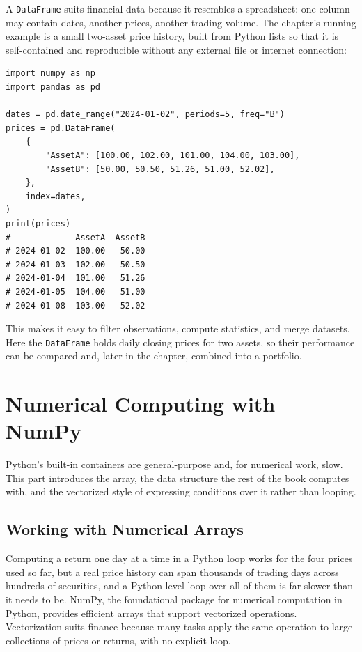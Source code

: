 \documentclass[../ai_in_finance]{subfiles}
\begin{document}
A \texttt{DataFrame} suits financial data because it resembles a spreadsheet: one column may contain dates, another prices, another trading volume. The chapter's running example is a small two-asset price history, built from Python lists so that it is self-contained and reproducible without any external file or internet connection:

\begin{verbatim}
import numpy as np
import pandas as pd

dates = pd.date_range("2024-01-02", periods=5, freq="B")
prices = pd.DataFrame(
    {
        "AssetA": [100.00, 102.00, 101.00, 104.00, 103.00],
        "AssetB": [50.00, 50.50, 51.26, 51.00, 52.02],
    },
    index=dates,
)
print(prices)
#             AssetA  AssetB
# 2024-01-02  100.00   50.00
# 2024-01-03  102.00   50.50
# 2024-01-04  101.00   51.26
# 2024-01-05  104.00   51.00
# 2024-01-08  103.00   52.02
\end{verbatim}

This makes it easy to filter observations, compute statistics, and merge datasets. Here the \texttt{DataFrame} holds daily closing prices for two assets, so their performance can be compared and, later in the chapter, combined into a portfolio.

\section{Numerical Computing with NumPy}

Python's built-in containers are general-purpose and, for numerical work, slow. This part introduces the array, the data structure the rest of the book computes with, and the vectorized style of expressing conditions over it rather than looping.

\subsection{Working with Numerical Arrays}
\label{sec:vectorization}

Computing a return one day at a time in a Python loop works for the four prices used so far, but a real price history can span thousands of trading days across hundreds of securities, and a Python-level loop over all of them is far slower than it needs to be. NumPy, the foundational package for numerical computation in Python, provides efficient arrays that support vectorized operations. Vectorization suits finance because many tasks apply the same operation to large collections of prices or returns, with no explicit loop.
\end{document}
